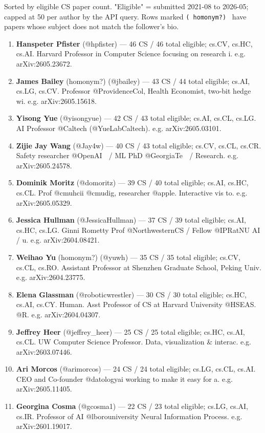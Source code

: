 \documentclass[twocolumn,10pt,letterpaper]{article}
\begin{document}
Sorted by eligible CS paper count. "Eligible" = submitted 2021-08 to 2026-05; capped at 50 per author by the API query. Rows marked \texttt{( homonym?) } have papers whose subject does not match the follower's bio.


\begin{enumerate}
\setlength{\itemsep}{0pt}
\setlength{\parskip}{0pt}
  \item \textbf{Hanspeter Pfister} (@hpfister) — 46 CS / 46 total eligible; cs.CV, cs.HC, cs.AI. Harvard Professor in Computer Science focusing on research i. e.g. arXiv:2605.23672.
  \item \textbf{James Bailey} (homonym?) (@jbailey) — 43 CS / 44 total eligible; cs.AI, cs.LG, cs.CV. Professor @ProvidenceCol, Health Economist, two-bit hedge wi. e.g. arXiv:2605.15618.
  \item \textbf{Yisong Yue} (@yisongyue) — 42 CS / 43 total eligible; cs.AI, cs.CL, cs.LG. AI Professor @Caltech (@YueLabCaltech). e.g. arXiv:2605.03101.
  \item \textbf{Zijie Jay Wang} (@Jay4w) — 40 CS / 43 total eligible; cs.CV, cs.CL, cs.CR. Safety researcher @OpenAI 🤖 / ML PhD @GeorgiaTe 🐝 / Research. e.g. arXiv:2605.24578.
  \item \textbf{Dominik Moritz} (@domoritz) — 39 CS / 40 total eligible; cs.AI, cs.HC, cs.CL. Prof @cmuhcii @cmudig, researcher @apple. Interactive vis to. e.g. arXiv:2605.05329.
  \item \textbf{Jessica Hullman} (@JessicaHullman) — 37 CS / 39 total eligible; cs.AI, cs.HC, cs.LG. Ginni Rometty Prof @NorthwesternCS / Fellow @IPRatNU  AI / u. e.g. arXiv:2604.08421.
  \item \textbf{Weihao Yu} (homonym?) (@yuwh) — 35 CS / 35 total eligible; cs.CV, cs.CL, cs.RO. Assistant Professor at Shenzhen Graduate School, Peking Univ. e.g. arXiv:2604.23775.
  \item \textbf{Elena Glassman} (@roboticwrestler) — 30 CS / 30 total eligible; cs.HC, cs.AI, cs.CY. Human. Asst Professor of CS at Harvard University @HSEAS. @R. e.g. arXiv:2604.04307.
  \item \textbf{Jeffrey Heer} (@jeffrey\_heer) — 25 CS / 25 total eligible; cs.HC, cs.AI, cs.CL. UW Computer Science Professor. Data, visualization \& interac. e.g. arXiv:2603.07446.
  \item \textbf{Ari Morcos} (@arimorcos) — 24 CS / 24 total eligible; cs.LG, cs.CL, cs.AI. CEO and Co-founder @datologyai working to make it easy for a. e.g. arXiv:2605.11405.
  \item \textbf{Georgina Cosma} (@gcosma1) — 22 CS / 23 total eligible; cs.LG, cs.AI, cs.IR. Professor of AI @lborouniversity  Neural Information Process. e.g. arXiv:2601.19017.

\end{enumerate}
\end{document}
